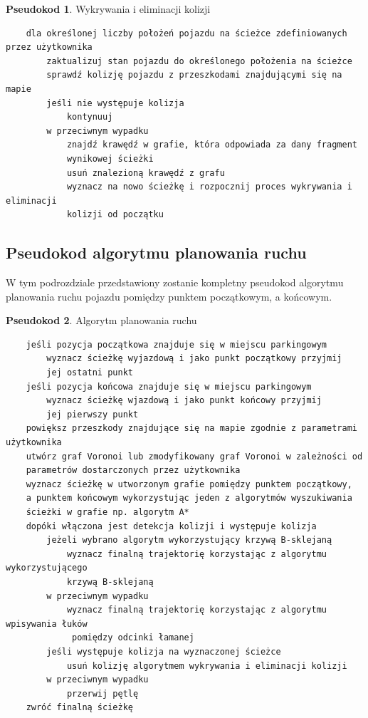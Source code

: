 \documentclass[a4paper,11pt,twoside]{report}
\theoremstyle{definition}
\newtheorem{pseudokod}{Pseudokod}[subsection]
\begin{document}
\newpage

\begin{pseudokod}
Wykrywania i eliminacji kolizji
\begin{verbatim}
    dla określonej liczby położeń pojazdu na ścieżce zdefiniowanych przez użytkownika
        zaktualizuj stan pojazdu do określonego położenia na ścieżce
        sprawdź kolizję pojazdu z przeszkodami znajdującymi się na mapie
        jeśli nie występuje kolizja
            kontynuuj
        w przeciwnym wypadku
            znajdź krawędź w grafie, która odpowiada za dany fragment 
            wynikowej ścieżki
            usuń znalezioną krawędź z grafu
            wyznacz na nowo ścieżkę i rozpocznij proces wykrywania i eliminacji 
            kolizji od początku
\end{verbatim}
\end{pseudokod}

\subsection{Pseudokod algorytmu planowania ruchu}

W tym podrozdziale przedstawiony zostanie kompletny pseudokod algorytmu planowania ruchu pojazdu pomiędzy punktem początkowym, a końcowym.

\begin{pseudokod}
Algorytm planowania ruchu
\begin{verbatim}
    jeśli pozycja początkowa znajduje się w miejscu parkingowym
        wyznacz ścieżkę wyjazdową i jako punkt początkowy przyjmij 
        jej ostatni punkt
    jeśli pozycja końcowa znajduje się w miejscu parkingowym
        wyznacz ścieżkę wjazdową i jako punkt końcowy przyjmij 
        jej pierwszy punkt
    powiększ przeszkody znajdujące się na mapie zgodnie z parametrami użytkownika
    utwórz graf Voronoi lub zmodyfikowany graf Voronoi w zależności od 
    parametrów dostarczonych przez użytkownika
    wyznacz ścieżkę w utworzonym grafie pomiędzy punktem początkowy, 
    a punktem końcowym wykorzystując jeden z algorytmów wyszukiwania 
    ścieżki w grafie np. algorytm A*
    dopóki włączona jest detekcja kolizji i występuje kolizja
        jeżeli wybrano algorytm wykorzystujący krzywą B-sklejaną
            wyznacz finalną trajektorię korzystając z algorytmu wykorzystującego 
            krzywą B-sklejaną
        w przeciwnym wypadku
            wyznacz finalną trajektorię korzystając z algorytmu wpisywania łuków
             pomiędzy odcinki łamanej
        jeśli występuje kolizja na wyznaczonej ścieżce
            usuń kolizję algorytmem wykrywania i eliminacji kolizji
        w przeciwnym wypadku
            przerwij pętlę
    zwróć finalną ścieżkę
\end{verbatim}
\end{pseudokod}
\end{document}
